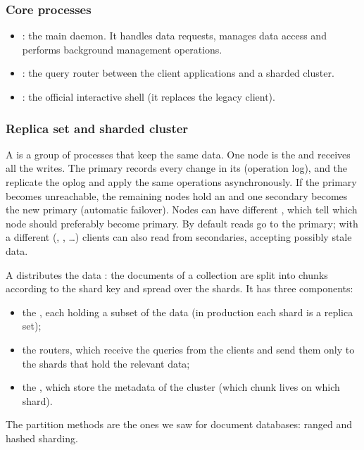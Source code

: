 \subsubsection{Core processes}
\begin{itemize}
  \item {}: the main daemon. It handles data requests, manages data access and performs background management operations.
  \item {}: the query router between the client applications and a sharded cluster.
  \item {}: the official interactive shell (it replaces the legacy  client).
\end{itemize}

\subsubsection{Replica set and sharded cluster}
A  is a group of  processes that keep the same data. One node is the  and receives all the writes. The primary records every change in its  (operation log), and the  replicate the oplog and apply the same operations asynchronously. If the primary becomes unreachable, the remaining nodes hold an  and one secondary becomes the new primary (automatic failover). Nodes can have different , which tell which node should preferably become primary. By default reads go to the primary; with a different  (, , \dots) clients can also read from secondaries, accepting possibly stale data.

A  distributes the data : the documents of a collection are split into chunks according to the shard key and spread over the shards. It has three components:
\begin{itemize}
  \item the , each holding a subset of the data (in production each shard is a replica set);
  \item the  routers, which receive the queries from the clients and send them only to the shards that hold the relevant data;
  \item the , which store the metadata of the cluster (which chunk lives on which shard).
\end{itemize}
The partition methods are the ones we saw for document databases: ranged and hashed sharding.

